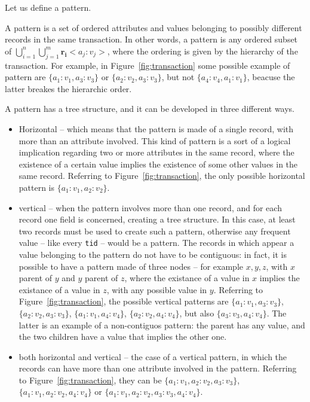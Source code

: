 \documentclass{acm_proc_article-sp-sigmod09}
\begin{document}
Let us define a pattern.
\begin{definition}
A pattern is a set of ordered attributes and values belonging to possibly different records in the same transaction. In other words, a pattern is any ordered subset of $\bigcup\limits_{i=1}^{n} \bigcup\limits_{j=1}^{m} \boldsymbol{r_i}<a_j \colon v_j>$, where the ordering is given by the hierarchy of the transaction. For example, in Figure~\ref{fig:transaction} some possible example of pattern are $\{a_1 \colon v_1, a_3 \colon v_3\}$ or $\{a_2 \colon v_2, a_3 \colon v_3\}$, but not $\{a_4 \colon v_4, a_1 \colon v_1\}$, beacuse the latter breakes the hierarchic order.

A pattern has a tree structure, and it can be developed in three different ways.
\begin{itemize}
\item Horizontal -- which means that the pattern is made of a single record, with more than an attribute involved. This kind of pattern is a sort of a logical implication regarding two or more attributes in the same record, where the existence of a certain value implies the existence of some other values in the same record. Referring to Figure~\ref{fig:transaction}, the only possible horizontal pattern is $\{a_1 \colon v_1, a_2 \colon v_2\}$.
\item vertical -- when the pattern involves more than one record, and for each record one field is concerned, creating a tree structure. In this case, at least two records must be used to create such a pattern, otherwise any frequent value -- like every \texttt{tid} -- would be a pattern. The records in which appear a value belonging to the pattern do not have to be contiguous: in fact, it is possible to have a pattern made of three nodes -- for example $x, y, z$, with $x$ parent of $y$ and $y$ parent of $z$, where the existance of a value in $x$ implies the existance of a value in $z$, with any possible value in $y$. Referring to Figure~\ref{fig:transaction}, the possible vertical patterns are $\{a_1 \colon v_1, a_3 \colon v_3\}$, $\{a_2 \colon v_2, a_3 \colon v_3\}$, $\{a_1 \colon v_1, a_4 \colon v_4\}$, $\{a_2 \colon v_2, a_4 \colon v_4\}$, but also $\{a_3 \colon v_3, a_4 \colon v_4\}$. The latter is an example of a non-contiguos pattern: the parent has any value, and the two children have a value that implies the other one.
\item both horizontal and vertical -- the case of a vertical pattern, in which the records can have more than one attribute involved in the pattern. Referring to Figure~\ref{fig:transaction}, they can be $\{a_1 \colon v_1, a_2 \colon v_2, a_3 \colon v_3\}$, $\{a_1 \colon v_1, a_2 \colon v_2, a_4 \colon v_4\}$ or $\{a_1 \colon v_1, a_2 \colon v_2, a_3 \colon v_3, a_4 \colon v_4\}$.
\end{itemize}
\end{definition}
\end{document}

